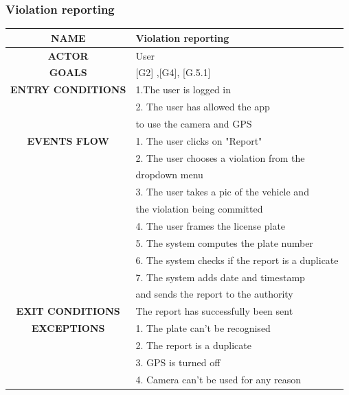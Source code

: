 \documentclass[12pt,a4paper]{article}
\begin{document}
\subsubsection{Violation reporting}
		\begin{center}
			\begin{tabular}{| c | l |}
				\hline
				\textbf{NAME} & Violation reporting \\
				\hline
				\textbf{ACTOR} & User \\
				\hline
				\textbf{GOALS} & [G2] ,[G4], [G.5.1] \\
				\hline
				\textbf{ENTRY CONDITIONS} &1.The user is logged in \\
				&2. The user has allowed the app \\
				&to use the camera and GPS \\ \hline
				\textbf{EVENTS FLOW}  &
				1. The user clicks on "Report"\\
				&2. The user chooses a violation from the \\
				& dropdown menu \\
				&3. The user takes a pic of the vehicle and \\
				& the violation being committed \\ \hline
				&4. The user frames the license plate\\
				&5. The system computes the plate number \\
				&6. The system checks if the report is a duplicate\\
				&7. The system adds date and timestamp \\
				& and sends the report to the authority \\ 
				\hline
				\textbf{EXIT CONDITIONS}  & The report has successfully been sent \\ \hline
				\textbf{EXCEPTIONS} &
				1. The plate can't be recognised \\
				&2. The report is a duplicate\\
				&3. GPS is turned off\\
				&4. Camera can't be used for any reason\\
				\hline
			\end{tabular}
		\end{center}
\newpage
\end{document}
